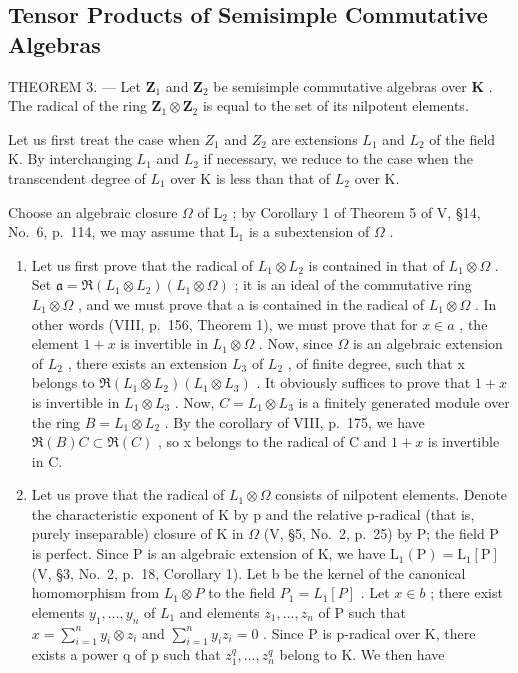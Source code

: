 \subsection{Tensor Products of Semisimple Commutative Algebras}

THEOREM 3. --- Let \(\mathbf{Z}_1\) and \(\mathbf{Z}_2\) be semisimple commutative algebras over \(\mathbf{K}\) . The radical of the ring \(\mathbf{Z}_1 \otimes \mathbf{Z}_2\) is equal to the set of its nilpotent elements.

Let us first treat the case when \(Z_{1}\) and \(Z_{2}\) are extensions \(L_{1}\) and \(L_{2}\) of the field K. By interchanging \(L_{1}\) and \(L_{2}\) if necessary, we reduce to the case when the transcendent degree of \(L_{1}\) over K is less than that of \(L_{2}\) over K.

Choose an algebraic closure \(\Omega\) of \(\mathrm{L}_2\) ; by Corollary 1 of Theorem 5 of V, §14, No.~6, p.~114, we may assume that \(\mathrm{L}_1\) is a subextension of \(\Omega\) .

\begin{enumerate}
\def\labelenumi{\Alph{enumi})}
\item
  Let us first prove that the radical of \(L_{1} \otimes L_{2}\) is contained in that of \(L_{1} \otimes \Omega\) . Set \(\mathfrak{a} = \Re(L_{1} \otimes L_{2})(L_{1} \otimes \Omega)\) ; it is an ideal of the commutative ring \(L_{1} \otimes \Omega\) , and we must prove that a is contained in the radical of \(L_{1} \otimes \Omega\) . In other words (VIII, p.~156, Theorem 1), we must prove that for \(x \in a\) , the element \(1 + x\) is invertible in \(L_{1} \otimes \Omega\) . Now, since \(\Omega\) is an algebraic extension of \(L_{2}\) , there exists an extension \(L_{3}\) of \(L_{2}\) , of finite degree, such that x belongs to \(\Re(L_{1} \otimes L_{2})(L_{1} \otimes L_{3})\) . It obviously suffices to prove that \(1 + x\) is invertible in \(L_{1} \otimes L_{3}\) . Now, \(C = L_{1} \otimes L_{3}\) is a finitely generated module over the ring \(B = L_{1} \otimes L_{2}\) . By the corollary of VIII, p.~175, we have \(\Re(B)C \subset \Re(C)\) , so x belongs to the radical of C and \(1 + x\) is invertible in C.
\item
  Let us prove that the radical of \(L_{1} \otimes \Omega\) consists of nilpotent elements. Denote the characteristic exponent of K by p and the relative p-radical (that is, purely inseparable) closure of K in \(\Omega\) (V, §5, No.~2, p.~25) by P; the field P is perfect. Since P is an algebraic extension of K, we have \(\mathrm{L}_{1}(\mathrm{P}) = \mathrm{L}_{1}[\mathrm{P}]\) (V, §3, No.~2, p.~18, Corollary 1). Let b be the kernel of the canonical homomorphism from \(L_{1} \otimes P\) to the field \(P_{1} = L_{1}[P]\) . Let \(x \in b\) ; there exist elements \(y_{1}, \ldots, y_{n}\) of \(L_{1}\) and elements \(z_{1}, \ldots, z_{n}\) of P such that \(x = \sum_{i=1}^{n} y_{i} \otimes z_{i}\) and \(\sum_{i=1}^{n} y_{i} z_{i} = 0\) . Since P is p-radical over K, there exists a power q of p such that \(z_{1}^{q}, \ldots, z_{n}^{q}\) belong to K. We then have
\end{enumerate}

